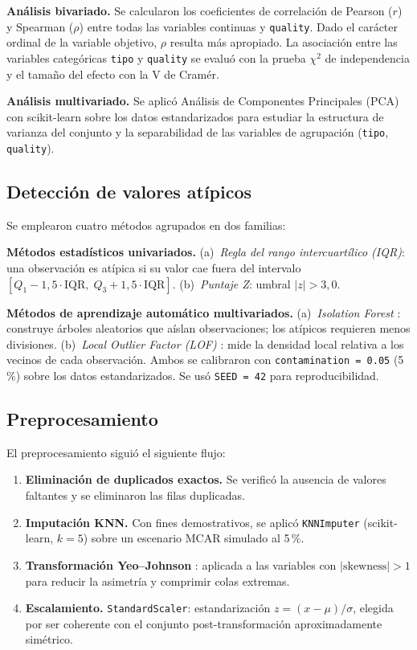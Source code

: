 \documentclass[conference]{IEEEtran}
\begin{document}
\textbf{Análisis bivariado.} Se calcularon los coeficientes de correlación de
Pearson ($r$) y Spearman ($\rho$) entre todas las variables continuas y
\texttt{quality}. Dado el carácter ordinal de la variable objetivo, $\rho$
resulta más apropiado. La asociación entre las variables categóricas
\texttt{tipo} y \texttt{quality} se evaluó con la prueba $\chi^2$ de
independencia y el tamaño del efecto con la V de Cramér.

\textbf{Análisis multivariado.} Se aplicó Análisis de Componentes Principales
(PCA) con scikit-learn \cite{sklearn} sobre los datos estandarizados para
estudiar la estructura de varianza del conjunto y la separabilidad de las
variables de agrupación (\texttt{tipo}, \texttt{quality}).

\subsection{Detección de valores atípicos}

Se emplearon cuatro métodos agrupados en dos familias:

\textbf{Métodos estadísticos univariados.} (a)~\textit{Regla del rango
intercuartílico (IQR)}: una observación es atípica si su valor cae fuera del
intervalo $[Q_1 - 1{,}5 \cdot \text{IQR},\; Q_3 + 1{,}5 \cdot \text{IQR}]$.
(b)~\textit{Puntaje Z}: umbral $|z| > 3{,}0$.

\textbf{Métodos de aprendizaje automático multivariados.} (a)~\textit{Isolation
Forest} \cite{liu2008iforest}: construye árboles aleatorios que aíslan
observaciones; los atípicos requieren menos divisiones. (b)~\textit{Local
Outlier Factor (LOF)} \cite{breunig2000lof}: mide la densidad local relativa a
los vecinos de cada observación. Ambos se calibraron con
\texttt{contamination\,=\,0.05} (5\,\%) sobre los datos estandarizados.
Se usó \texttt{SEED\,=\,42} para reproducibilidad.

\subsection{Preprocesamiento}

El preprocesamiento siguió el siguiente flujo:

\begin{enumerate}
    \item \textbf{Eliminación de duplicados exactos.} Se verificó la ausencia
    de valores faltantes y se eliminaron las filas duplicadas.
    \item \textbf{Imputación KNN.} Con fines demostrativos, se aplicó
    \texttt{KNNImputer} (scikit-learn, $k=5$) sobre un escenario MCAR
    simulado al 5\,\%.
    \item \textbf{Transformación Yeo--Johnson} \cite{yeo2000power}: aplicada a
    las variables con $|\text{skewness}| > 1$ para reducir la asimetría y
    comprimir colas extremas.
    \item \textbf{Escalamiento.} \texttt{StandardScaler}: estandarización
    $z = (x - \mu)/\sigma$, elegida por ser coherente con el conjunto
    post-transformación aproximadamente simétrico.
\end{enumerate}
\end{document}
